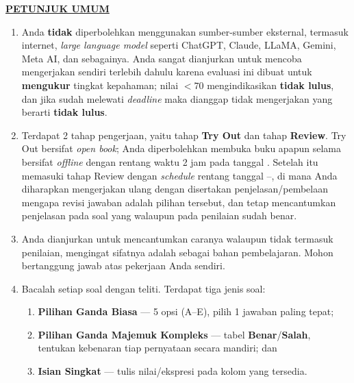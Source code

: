 \documentclass[11pt]{article}
\begin{document}
\noindent\textbf{\underline{PETUNJUK UMUM}}
\begin{enumerate}[leftmargin=*,itemsep=4pt,topsep=4pt]
  \item Anda \textbf{tidak} diperbolehkan menggunakan sumber-sumber eksternal,
        termasuk internet, \textit{large language model} seperti ChatGPT, Claude,
        LLaMA, Gemini, Meta AI, dan sebagainya. Anda sangat dianjurkan untuk
        mencoba mengerjakan sendiri terlebih dahulu karena evaluasi ini dibuat
        untuk \textbf{mengukur} tingkat kepahaman; nilai $<70$ mengindikasikan
        \textbf{tidak lulus}, dan jika sudah melewati \textit{deadline} maka
        dianggap tidak mengerjakan yang berarti \textbf{tidak lulus}.

  \item Terdapat 2 tahap pengerjaan, yaitu tahap \textbf{Try Out} dan tahap
        \textbf{Review}. Try Out bersifat \textit{open book}; Anda diperbolehkan
        membuka buku apapun selama bersifat \textit{offline} dengan rentang waktu
        2 jam pada tanggal \underline{\hspace{3cm}}. Setelah itu memasuki
        tahap Review dengan \textit{schedule} rentang tanggal
        \underline{\hspace{3cm}}--\underline{\hspace{3cm}}, di mana Anda
        diharapkan mengerjakan ulang dengan disertakan penjelasan/pembelaan
        mengapa revisi jawaban adalah pilihan tersebut, dan tetap mencantumkan
        penjelasan pada soal yang walaupun pada penilaian sudah benar.

  \item Anda dianjurkan untuk mencantumkan caranya walaupun tidak termasuk
        penilaian, mengingat sifatnya adalah sebagai bahan pembelajaran.
        Mohon bertanggung jawab atas pekerjaan Anda sendiri.

  \item Bacalah setiap soal dengan teliti. Terdapat tiga jenis soal:
        \begin{enumerate}[label=(\arabic*),leftmargin=2em,topsep=2pt,itemsep=2pt]
          \item \textbf{Pilihan Ganda Biasa} --- 5 opsi (A--E), pilih
                1 jawaban paling tepat;
          \item \textbf{Pilihan Ganda Majemuk Kompleks} --- tabel
                \textbf{Benar}/\textbf{Salah}, tentukan kebenaran tiap
                pernyataan secara mandiri; dan
          \item \textbf{Isian Singkat} --- tulis nilai/ekspresi pada
                kolom yang tersedia.
        \end{enumerate}


\end{enumerate}
\end{document}
